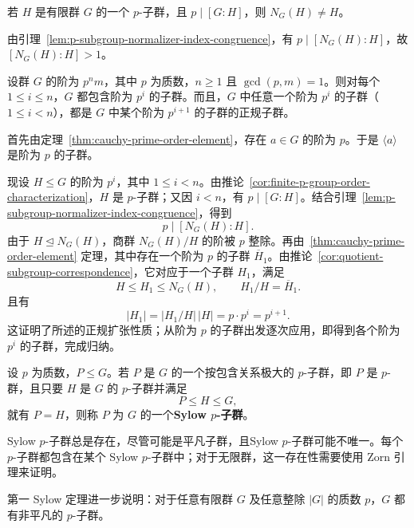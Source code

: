 \begin{corollary}\label{cor:p-subgroup-proper-normalizer}
若 $H$ 是有限群 $G$ 的一个 $p$-子群，且 $p\mid[G:H]$，则 $N_G(H)\ne H$。
\end{corollary}

\begin{purpleproof}
由引理~\ref{lem:p-subgroup-normalizer-index-congruence}，有 $p\mid[N_G(H):H]$，故 $[N_G(H):H]>1$。
\end{purpleproof}

\begin{theorem}[第一 Sylow 定理]\label{thm:first-sylow}
设群 $G$ 的阶为 $p^nm$，其中 $p$ 为质数，$n\geq1$ 且 $\gcd(p,m)=1$。则对每个 $1\leq i\leq n$，$G$ 都包含阶为 $p^i$ 的子群。而且，$G$ 中任意一个阶为 $p^i$ 的子群（$1\leq i<n$），都是 $G$ 中某个阶为 $p^{i+1}$ 的子群的正规子群。
\end{theorem}

\begin{purpleproof}
首先由定理~\ref{thm:cauchy-prime-order-element}，存在 $a\in G$ 的阶为 $p$。于是 $\langle a\rangle$ 是阶为 $p$ 的子群。

现设 $H\leq G$ 的阶为 $p^i$，其中 $1\leq i<n$。由推论~\ref{cor:finite-p-group-order-characterization}，$H$ 是 $p$-子群；又因 $i<n$，有 $p\mid[G:H]$。结合引理~\ref{lem:p-subgroup-normalizer-index-congruence}，得到
\[
  p\mid[N_G(H):H].
\]
由于 $H\trianglelefteq N_G(H)$，商群 $N_G(H)/H$ 的阶被 $p$ 整除。再由~\ref{thm:cauchy-prime-order-element} 定理，其中存在一个阶为 $p$ 的子群 $\overline H_1$。由推论~\ref{cor:quotient-subgroup-correspondence}，它对应于一个子群 $H_1$，满足
\[
  H\leq H_1\leq N_G(H),\qquad H_1/H=\overline H_1.
\]
且有
\[
  |H_1|=|H_1/H|\,|H|=p\cdot p^i=p^{i+1}.
\]
这证明了所述的正规扩张性质；从阶为 $p$ 的子群出发逐次应用，即得到各个阶为 $p^i$ 的子群，完成归纳。
\end{purpleproof}

\begin{definition}[Sylow $p$-子群]\label{def:sylow-p-subgroup}
设 $p$ 为质数，$P\leq G$。若 $P$ 是 $G$ 的一个按包含关系极大的 $p$-子群，即 $P$ 是 $p$-群，且只要 $H$ 是 $G$ 的 $p$-子群并满足
\[
  P\leq H\leq G,
\]
就有 $P=H$，则称 $P$ 为 $G$ 的一个\textbf{Sylow $p$-子群}。
\end{definition}

\begin{purplenote}
Sylow $p$-子群总是存在，尽管可能是平凡子群，且Sylow $p$-子群可能不唯一。每个 $p$-子群都包含在某个 Sylow $p$-子群中；对于无限群，这一存在性需要使用 Zorn 引理来证明。

第一 Sylow 定理进一步说明：对于任意有限群 $G$ 及任意整除 $|G|$ 的质数 $p$，$G$ 都有非平凡的 $p$-子群。
\end{purplenote}

